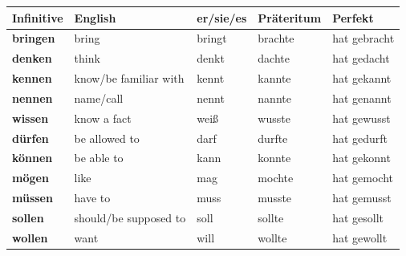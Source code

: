 \begin{center}
\small
{}
\begin{tabularx}{\textwidth}{@{}>{\bfseries}l l l l X@{}}
\toprule
Infinitive & English & er/sie/es & Präteritum & Perfekt \\
\midrule
bringen & bring & bringt & brachte & hat gebracht \\
denken & think & denkt & dachte & hat gedacht \\
kennen & know/be familiar with & kennt & kannte & hat gekannt \\
nennen & name/call & nennt & nannte & hat genannt \\
wissen & know a fact & weiß & wusste & hat gewusst \\
\addlinespace
dürfen & be allowed to & darf & durfte & hat gedurft \\
können & be able to & kann & konnte & hat gekonnt \\
mögen & like & mag & mochte & hat gemocht \\
müssen & have to & muss & musste & hat gemusst \\
sollen & should/be supposed to & soll & sollte & hat gesollt \\
wollen & want & will & wollte & hat gewollt \\
\bottomrule
\end{tabularx}
\end{center}
